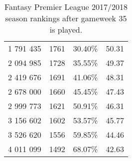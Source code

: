 \begin{table}[H]
\begin{tabular}{@{}cccc@{}}
1 791 435 & 1761         & 30.40\%      & 50.31 \\
2 094 985 & 1728         & 35.55\%      & 49.37 \\
2 419 676 & 1691         & 41.06\%      & 48.31 \\
2 678 000 & 1660         & 45.45\%      & 47.43 \\
2 999 773 & 1621         & 50.91\%      & 46.31 \\
3 156 602 & 1602         & 53.57\%      & 45.77 \\
3 526 620 & 1556         & 59.85\%      & 44.46 \\
4 011 099 & 1492         & 68.07\%      & 42.63 \\ \bottomrule
\end{tabular}
\caption{Fantasy Premier League 2017/2018 season rankings after gameweek 35 is played.}
\label{tab:appendix_rankings}
\end{table}


